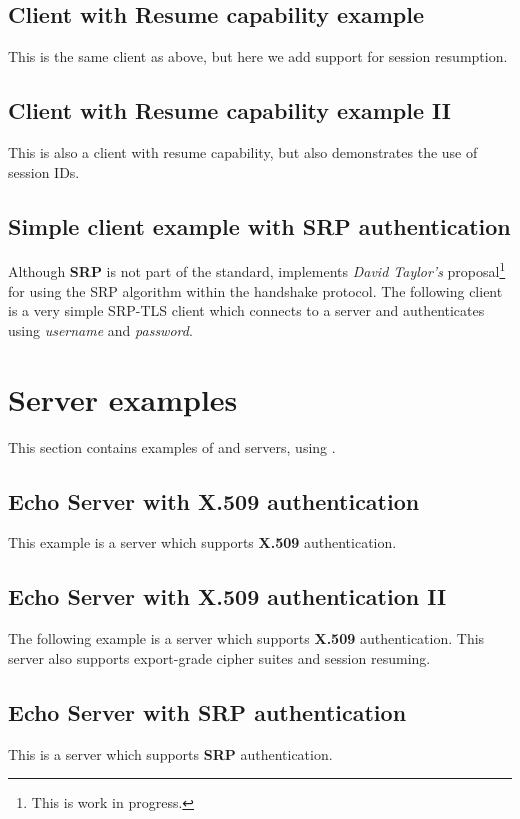 

\subsection{Client with Resume capability example}
\label{resume-example}
This is the same client as above, but here we add support for session
resumption.


\subsection{Client with Resume capability example II}
\label{resume-example2}
This is also a client with resume capability, but also demonstrates
the use of session IDs.


\subsection{Simple client example with SRP authentication}
Although {\bf SRP} is not part of the \tls{} standard, \gnutls{} implements
{\it David Taylor's} proposal\footnote{This is work in progress.}  for using the SRP algorithm
within the \tls{} handshake protocol. The following client
is a very simple SRP-TLS client which connects to a server 
and authenticates using {\it username} and {\it password}.



\section{Server examples}
This section contains examples of \tls{} and \ssl{} servers, using \gnutls{}.

\subsection{Echo Server with X.509 authentication}
This example is a server which supports {\bf X.509} authentication.


\subsection{Echo Server with X.509 authentication II}
The following example is a server which supports {\bf X.509} authentication.
This server also supports export-grade cipher suites and session resuming.


\subsection{Echo Server with SRP authentication}
This is a server which supports {\bf SRP} authentication.



